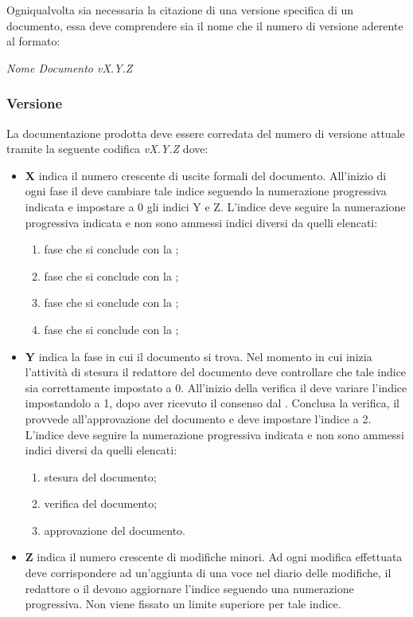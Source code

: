 \documentclass[12pt,a4paper]{article}
\begin{document}
Ogniqualvolta sia necessaria la citazione di una versione specifica di un documento, essa deve comprendere sia il nome che il numero di versione aderente al formato:
\begin{center}
\emph{Nome Documento vX.Y.Z}
\end{center}

\subsubsection{Versione} \label{Versione}
La documentazione prodotta deve essere corredata del numero di versione attuale tramite la seguente codifica \emph{vX.Y.Z} dove:
\begin{itemize}
  \item \textbf{X} indica il numero crescente di uscite formali del documento. All’inizio di ogni fase il \PM deve cambiare tale indice seguendo la numerazione progressiva indicata e impostare a 0 gli indici Y e Z. L’indice deve seguire la numerazione progressiva indicata e non sono ammessi indici diversi da quelli elencati:
  \begin{enumerate}
    \item fase che si conclude con la \RR;
    \item fase che si conclude con la \RP;
    \item fase che si conclude con la \RQ;
    \item fase che si conclude con la \RA;
  \end{enumerate}
  \item \textbf{Y} indica la fase in cui il documento si trova. Nel momento in cui inizia l’attività di stesura il redattore del documento deve controllare che tale indice sia correttamente impostato a 0. All’inizio della verifica il \VR{} deve variare l’indice impostandolo a 1, dopo aver ricevuto il consenso dal \PM. Conclusa la verifica, il \PM{} provvede all’approvazione del documento e deve impostare l’indice a 2. L’indice deve seguire la numerazione progressiva indicata e non sono ammessi indici diversi da quelli elencati:
  \begin{enumerate}[start=0]
    \item stesura del documento;
    \item verifica del documento;
    \item approvazione del documento.
  \end{enumerate}
  \item \textbf{Z} indica il numero crescente di modifiche minori. Ad ogni modifica effettuata deve corrispondere ad un’aggiunta di una voce nel diario delle modifiche, il redattore o il \VR devono aggiornare l’indice seguendo una numerazione progressiva. Non viene fissato un limite superiore per tale indice.
\end{itemize}
\end{document}
